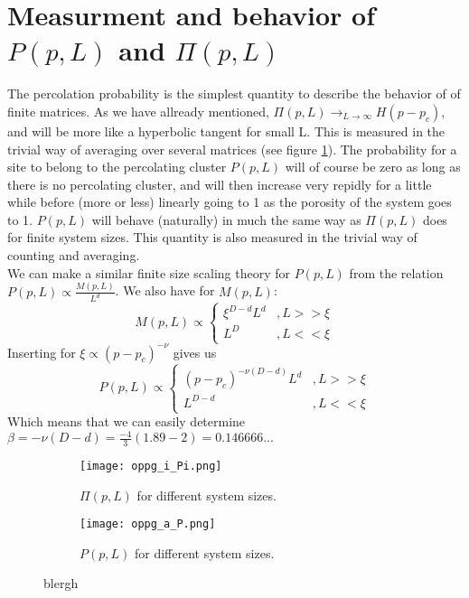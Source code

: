 \documentclass[a4paper,english, 10pt, twoside]{article}
\begin{document}
\section{Measurment and behavior of $P(p,L)$ and $\Pi(p,L)$}\label{section_15}
The percolation probability is the simplest quantity to describe the behavior of of finite matrices. As we have 
allready mentioned, $\Pi(p,L)\to_{L\to\infty}H(p-p_c)$, and will be more like a hyperbolic tangent for small L. 
This is measured in the trivial way of averaging over several matrices (see figure \ref{sect_15:pi}). The probability 
for a site to belong to the percolating cluster $P(p,L)$ will of course be zero as long as there is no percolating 
cluster, and will then increase very repidly for a little while before (more or less) linearly going to 1 as the 
porosity of the system goes to 1. $P(p,L)$ will behave (naturally) in much the same way as $\Pi(p,L)$ does for finite 
system sizes. This quantity is also measured in the trivial way of counting and averaging.\\
We can make a similar finite size scaling theory for $P(p,L)$ from the relation $P(p,L) \propto \frac{M(p,L)}{L^d}$. 
We also have for $M(p,L)$:
\begin{equation*}
M(p,L) \propto \begin{cases}
	    \xi^{D-d}L^d & , L>>\xi \\
	    L^D & , L<<\xi
               \end{cases}
\end{equation*}
Inserting for $\xi \propto (p-p_c)^{-\nu}$ gives us 
\begin{equation*}
P(p,L) \propto \begin{cases}
	    (p-p_c)^{-\nu(D-d)}L^d & , L>>\xi \\
	    L^{D-d} & , L<<\xi
               \end{cases}
\end{equation*}
Which means that we can easily determine $\beta = -\nu(D-d) = \frac{-4}{3}(1.89-2) = 0.146666...$
\begin{figure}[H]
\centering
\begin{subfigure}[b]{0.48\textwidth}
 \texttt{[image: oppg\_i\_Pi.png]}
 \caption{$\Pi(p,L)$ for different system sizes.}
 \label{sect_15:pi}
\end{subfigure}
\begin{subfigure}[b]{0.48\textwidth}
  \texttt{[image: oppg\_a\_P.png]}
 \caption{$P(p,L)$ for different system sizes.}
 \label{sect_15:P}
\end{subfigure}
\caption{blergh}
\label{sect_15}
\end{figure}
\end{document}
